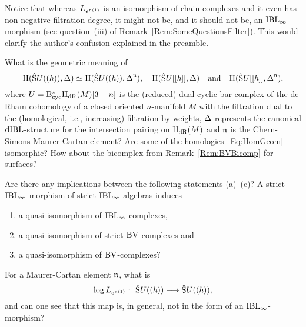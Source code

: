 \documentclass[\MainFolder/Text.tex]{subfiles}
\begin{document}
Notice that whereas $L_{e^{\mathfrak{n}(1)}}$ is an isomorphism of chain complexes and it even has non-negative filtration degree, it might not be, and it should not be, an $\mathrm{IBL}_\infty$-morphism (see question~(iii) of Remark~\ref{Rem:SomeQuestionsFilter}). This would clarify the author's confusion explained in the preamble.

\begin{Remark}\label{Rem:SomeQuestionsFilter}\begin{RemarkList}
\item What is the geometric meaning of 
\begin{equation}\label{Eq:HomGeom}
\mathrm{H}(\hat{\mathrm{S}}U((\hbar)),\operatorname{\Delta}) \simeq \mathrm{H}(\hat{\mathrm{S}}U((\hbar)),\operatorname{\Delta}^{\mathfrak{n}}), \quad\mathrm{H}(\hat{\mathrm{S}}U[[\hbar]],\operatorname{\Delta})\quad\text{and}\quad\mathrm{H}(\hat{\mathrm{S}}U[[\hbar]],\operatorname{\Delta}^{\mathfrak{n}}),
\end{equation}
where $U=\mathrm{B}_{\mathrm{cyc}}^*\mathrm{H}_{\mathrm{dR}}(M)[3-n]$ is the (reduced) dual cyclic bar complex of the de Rham cohomology of a closed oriented $n$-manifold $M$ with the filtration dual to the (homological, i.e., increasing) filtration by weights, $\operatorname{\Delta}$ represents the canonical $\mathrm{dIBL}$-structure for the intersection pairing on $\mathrm{H}_{\mathrm{dR}}(M)$ and $\mathfrak{n}$ is the Chern-Simons Maurer-Cartan element? Are some of the homologies~\eqref{Eq:HomGeom} isomorphic? How about the bicomplex from Remark~\ref{Rem:BVBicomp} for surfaces?
\item Are there any implications between the following statements (a)--(c)? A strict $\mathrm{IBL}_\infty$-morphism of strict $\mathrm{IBL}_\infty$-algebras induces
\begin{enumerate}[label=(\alph*),leftmargin=1.5cm]
\item a quasi-isomorphism of $\mathrm{IBL}_\infty$-complexes,
\item a quasi-isomorphism of strict $\mathrm{BV}$-complexes and
\item a quasi-isomorphism of $\mathrm{BV}$-complexes? 
\end{enumerate}
\item For a Maurer-Cartan element $\mathfrak{n}$, what is
$$ \log L_{e^{\PMC(1)}}:\ \hat{\Sym}U((\hbar)) \longrightarrow \hat{\Sym}U((\hbar)), $$
and can one see that this map is, in general, not in the form of an $\mathrm{IBL}_\infty$-morphism?
\qedhere
\end{RemarkList}
\end{Remark}

\end{document}

